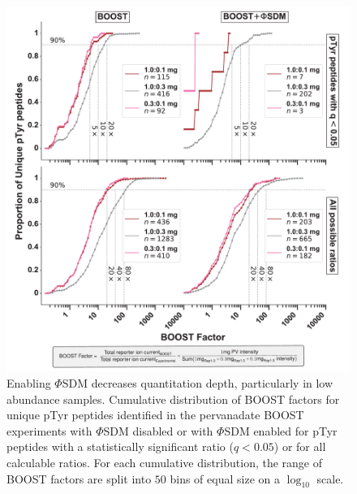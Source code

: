 \documentclass[journal=jprobs,manuscript=article]{achemso}
\begin{document}
\begin{figure}[t!]
\centering
\includegraphics[width=165mm]{figures/supplements/boost_factor_cdfs.pdf}
\caption{Enabling $\Phi$SDM decreases quantitation depth, particularly in low abundance samples. Cumulative distribution of BOOST factors for unique pTyr peptides identified in the pervanadate BOOST experiments with $\Phi$SDM disabled or with $\Phi$SDM enabled for pTyr peptides with a statistically significant ratio ($q<0.05$) or for all calculable ratios. For each cumulative distribution, the range of BOOST factors are split into $50$ bins of equal size on a $\log_{10}$ scale. }\label{boost_factor_cdfs}
\end{figure}

\clearpage
\end{document}
